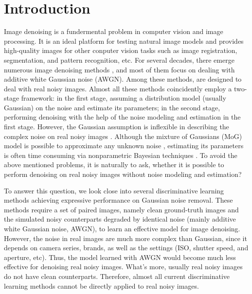 \documentclass[10pt,twocolumn,letterpaper]{article}
\begin{document}
\section{Introduction}
Image denoising is a fundermental problem in computer vision and image processing. It is an ideal platform for testing natural image models and provides high-quality images for other conputer vision tasks such as image registration, segmentation, and pattern recognition, etc. For several decades, there emerge numerous image denoising methods \cite{nlm,foe,ksvd,bm3d,lssc,epll,burger2012image,wnnm,csf,pgpd,chen2015learning,fullyblind,rabie2005robust,Liu2008,almapg,noiseclinic,Zhu_2016_CVPR,crosschannel2016}, and most of them focus on dealing with additive white Gaussian noise (AWGN). Among these methods, \cite{fullyblind,rabie2005robust,Liu2008,almapg,noiseclinic,Zhu_2016_CVPR,crosschannel2016} are designed to deal with real noisy images. Almost all these methods coincidently employ a two-stage framework: in the first stage, assuming a distribution model (usually Gaussian) on the noise and estimate its parameters; in the second stage, performing denoising with the help of the noise modeling and estimation in the first stage. However, the Gaussian assumption is inflexible in describing the complex noise on real noisy images \cite{Liu2008,crosschannel2016}. Although the mixture of Gaussians (MoG) model is possible to approximate any unknown noise \cite{Zhu_2016_CVPR}, estimating its parameters is often time consuming via nonparametric Bayesian techniques \cite{Zhu_2016_CVPR} \cite{Bishop}. To avoid the above mentioned problems, it is naturally to ask, whether it is possible to perform denoising on real noisy images without noise modeling and estimation? 

To answer this question, we look close into several discriminative learning methods \cite{burger2012image,csf,chen2015learning} achieving expressive performance on Gaussian noise removal. These methods require a set of paired images, namely clean ground-truth images and the simulated noisy counterparts degraded by identical noise (mainly additive white Gaussian noise, AWGN), to learn an effective model for image denoising. However, the noise in real images are much more complex than Gaussian, since it depends on camera series, brands, as well as the settings (ISO, shutter speed, and aperture, etc). Thus, the model learned with AWGN would become much less effective for denoising real noisy images. What's more, usually real noisy images do not have clean counterparts. Therefore, almost all current discriminative learning methods cannot be directly applied to real noisy images.
\end{document}
